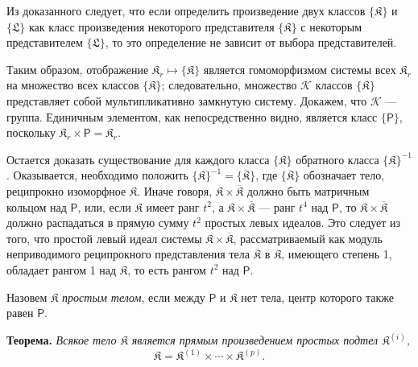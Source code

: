 \documentclass[11pt]{article}
\begin{document}
Из доказанного следует, что если определить произведение двух классов \(\{\mathfrak K\}\) и \(\{\mathfrak L\}\) как класс произведения некоторого представителя \(\{\mathfrak K\}\) с некоторым представителем \(\{\mathfrak L\}\), то это определение не зависит от выбора представителей.

Таким образом, отображение \(\mathfrak K_r\mapsto\{\mathfrak K\}\) является гомоморфизмом системы всех \(\mathfrak K_r\) на множество всех классов \(\{\mathfrak K\}\); следовательно, множество \(\mathscr K\) классов \(\{\mathfrak K\}\) представляет собой мультипликативно замкнутую систему. Докажем, что \(\mathscr K\) --- группа. Единичным элементом, как непосредственно видно, является класс \(\{\mathsf P\}\), поскольку \(\mathfrak K_r\times\mathsf P=\mathfrak K_r\).

Остается доказать существование для каждого класса \(\{\mathfrak K\}\) обратного класса \(\{\mathfrak K\}^{-1}\). Оказывается, необходимо положить \(\{\mathfrak K\}^{-1}=\{\overline{\mathfrak K}\}\), где \(\{\overline{\mathfrak K}\}\) обозначает тело, реципрокно изоморфное \(\mathfrak K\). Иначе говоря, \(\mathfrak K\times\overline{\mathfrak K}\) должно быть матричным кольцом над \(\mathsf P\), или, если \(\mathfrak K\) имеет ранг \(t^2\), а \(\mathfrak K\times\overline{\mathfrak K}\) --- ранг \(t^4\) над \(\mathsf P\), то \(\mathfrak K\times\overline{\mathfrak K}\) должно распадаться в прямую сумму \(t^2\) простых левых идеалов. Это следует из того, что простой левый идеал системы \(\mathfrak K\times\overline{\mathfrak K}\), рассматриваемый как модуль неприводимого реципрокного представления тела \(\overline{\mathfrak K}\) в \(\mathfrak K\), имеющего степень 1, обладает рангом 1 над \(\mathfrak K\), то есть рангом \(t^2\) над \(\mathsf P\).

Назовем \(\mathfrak K\) \emph{простым телом}, если между \(\mathsf P\) и \(\mathfrak K\) нет тела, центр которого также равен \(\mathsf P\).

\textbf{Теорема.} \emph{Всякое тело \(\mathfrak K\) является прямым произведением простых подтел \(\mathfrak K^{(i)}\),}
\[
\mathfrak K=\mathfrak K^{(1)}\times\cdots\times\mathfrak K^{(p)}.
\]
\end{document}
